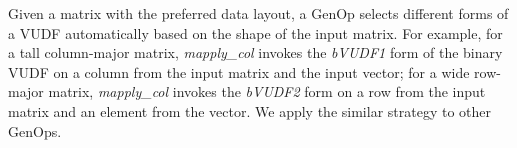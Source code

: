 Given a matrix with the preferred data layout, a GenOp selects different forms
of a VUDF automatically based on the shape of the input matrix. For example,
for a tall column-major matrix, \textit{mapply\_col} invokes the \textit{bVUDF1}
form of the binary VUDF on a column from the input matrix and the input vector;
for a wide row-major matrix, \textit{mapply\_col} invokes the \textit{bVUDF2}
form on a row from the input matrix and an element from the vector. We apply
the similar strategy to other GenOps.




